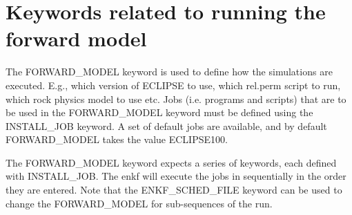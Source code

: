 \documentclass[a4paper,10pt,english]{sphinxmanual}
\begin{document}
\section{Keywords related to running the forward model}
\label{\detokenize{keywords/index:keywords-related-to-running-the-forward-model}}\label{\detokenize{keywords/index:id12}}\label{\detokenize{keywords/index:forward-model}}
\begin{sphinxShadowBox}

The FORWARD\_MODEL keyword is used to define how the simulations are executed.
E.g., which version of ECLIPSE to use, which rel.perm script to run, which
rock physics model to use etc. Jobs (i.e. programs and scripts) that are to be
used in the FORWARD\_MODEL keyword must be defined using the INSTALL\_JOB
keyword. A set of default jobs are available, and by default FORWARD\_MODEL
takes the value ECLIPSE100.

The FORWARD\_MODEL keyword expects a series of keywords, each defined with
INSTALL\_JOB. The enkf will execute the jobs in sequentially in the order they
are entered. Note that the ENKF\_SCHED\_FILE keyword can be used to change the
FORWARD\_MODEL for sub-sequences of the run.


%
\begin{sphinxVerbatim}[commandchars=\\\{\}]
       
       
   
  
\end{sphinxVerbatim}



\end{sphinxShadowBox}
\end{document}

